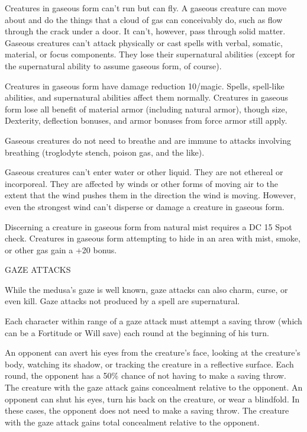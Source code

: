 \documentclass{article}
\begin{document}
Creatures in gaseous form can't run but can fly. A gaseous creature can move about 
and do the things that a cloud of gas can conceivably do, such as flow through 
the crack under a door. It can't, however, pass through solid matter. Gaseous creatures 
can't attack physically or cast spells with verbal, somatic, material, or focus 
components. They lose their supernatural abilities (except for the supernatural 
ability to assume gaseous form, of course).

Creatures in gaseous form have damage reduction 10/magic. Spells, spell-like abilities, 
and supernatural abilities affect them normally. Creatures in gaseous form lose 
all benefit of material armor (including natural armor), though size, Dexterity, 
deflection bonuses, and armor bonuses from force armor still apply.

Gaseous creatures do not need to breathe and are immune to attacks involving breathing 
(troglodyte stench, poison gas, and the like).

Gaseous creatures can't enter water or other liquid. They are not ethereal or incorporeal. 
They are affected by winds or other forms of moving air to the extent that the 
wind pushes them in the direction the wind is moving. However, even the strongest 
wind can't disperse or damage a creature in gaseous form.

Discerning a creature in gaseous form from natural mist requires a DC 15 Spot check. 
Creatures in gaseous form attempting to hide in an area with mist, smoke, or other 
gas gain a +20 bonus.

\vspace{12pt}
GAZE ATTACKS

While the medusa's gaze is well known, gaze attacks can also charm, curse, or even 
kill. Gaze attacks not produced by a spell are supernatural.

Each character within range of a gaze attack must attempt a saving throw (which 
can be a Fortitude or Will save) each round at the beginning of his turn.

An opponent can avert his eyes from the creature's face, looking at the creature's 
body, watching its shadow, or tracking the creature in a reflective surface. Each 
round, the opponent has a 50\% chance of not having to make a saving throw. The 
creature with the gaze attack gains concealment relative to the opponent. An opponent 
can shut his eyes, turn his back on the creature, or wear a blindfold. In these 
cases, the opponent does not need to make a saving throw. The creature with the 
gaze attack gains total concealment relative to the opponent.
\end{document}
